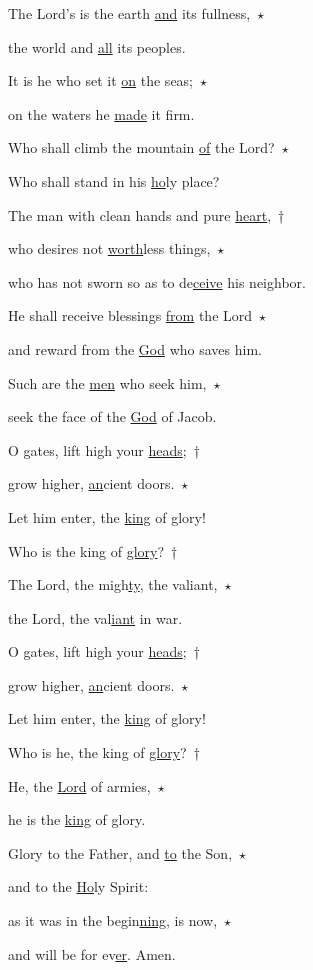 \noindent The Lord’s is the earth \uline{and} its fullness,~$\star$~\nopagebreak

the world and \uline{all} its peoples.

\noindent It is he who set it \uline{on} the seas;~$\star$~\nopagebreak

on the waters he \uline{made} it firm.

\noindent Who shall climb the mountain \uline{of} the Lord?~$\star$~\nopagebreak

Who shall stand in his \uline{ho}ly place?

\noindent The man with clean hands and pure \uline{heart},~†~\nopagebreak

who desires not \uline{worth}less things,~$\star$~\nopagebreak

who has not sworn so as to de\uline{ceive} his neighbor.

\noindent He shall receive blessings \uline{from} the Lord~$\star$~\nopagebreak

and reward from the \uline{God} who saves him.

\noindent Such are the \uline{men} who seek him,~$\star$~\nopagebreak

seek the face of the \uline{God} of Jacob.

\noindent O gates, lift high your \uline{heads};~†~\nopagebreak

grow higher, \uline{an}cient doors.~$\star$~\nopagebreak

Let him enter, the \uline{king} of glory!

\noindent Who is the king of \uline{glory}?~†~\nopagebreak

The Lord, the migh\uline{ty}, the valiant,~$\star$~\nopagebreak

the Lord, the val\uline{iant} in war.

\noindent O gates, lift high your \uline{heads};~†~\nopagebreak

grow higher, \uline{an}cient doors.~$\star$~\nopagebreak

Let him enter, the \uline{king} of glory!

\noindent Who is he, the king of \uline{glory}?~†~\nopagebreak

He, the \uline{Lord} of armies,~$\star$~\nopagebreak

he is the \uline{king} of glory.

\noindent Glory to the Father, and \uline{to} the Son,~$\star$~\nopagebreak

and to the \uline{Ho}ly Spirit:

\noindent as it was in the begin\uline{ning}, is now,~$\star$~\nopagebreak

and will be for ev\uline{er}. Amen.
